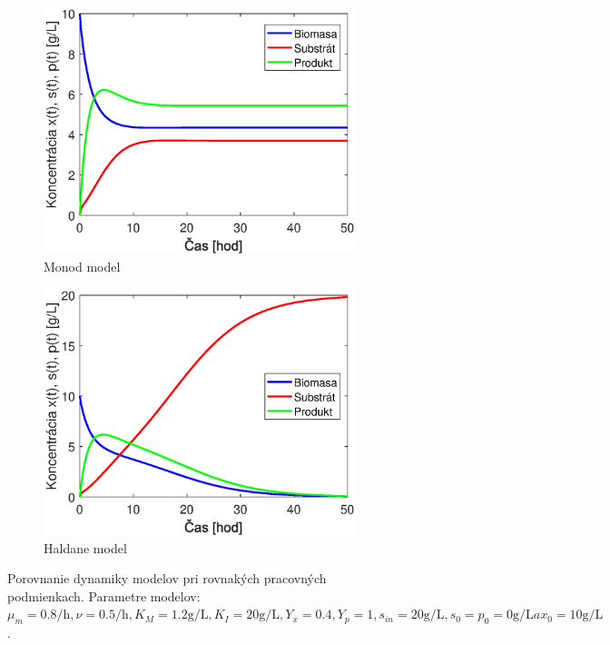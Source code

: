 \begin{figure}
	\centering
	\begin{subfigure}[b]{0.49\textwidth}
		\centering
		\includegraphics[width=\linewidth]{images/comparison_monod}
		\caption{Monod model}
		\label{fig:dyn_comparison_monod}
	\end{subfigure}
		\begin{subfigure}[b]{0.49\textwidth}
		\centering
		\includegraphics[width=\linewidth]{images/comparison_haldane}
		\caption{Haldane model}
		\label{fig:dyn_comparison_haldane}
	\end{subfigure}
	\caption{Porovnanie dynamiky modelov pri rovnakých pracovných podmienkach. Parametre modelov: $ \mu_{m} = 0.8\si{\per\hour}, \nu = 0.5\si{\per\hour}, K_{M} = 1.2\si{\gram\per\liter}, K_{I} = 20\si{\gram\per\liter}, Y_{x} = 0.4, Y_{p} = 1, s_{in} = 20\si{\gram\per\liter}, s_0 = p_0 = 0\si{\gram\per\liter} a x_0 = 10\si{\gram\per\liter}$.}
	\label{fig:dyn_comparison}
\end{figure}

